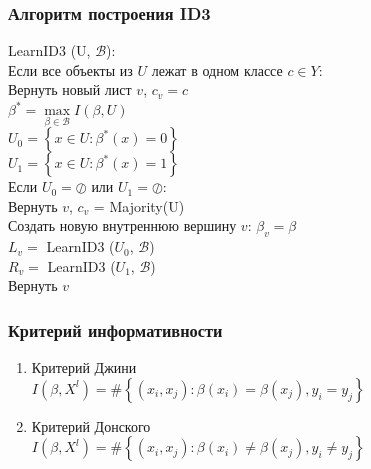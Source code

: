 \documentclass[12pt]{beamer}
\begin{document}
\begin{frame}\frametitle{Алгоритм построения ID3}
LearnID3 (U, $\mathcal{B}$):\\
\hspace{10mm} Если все объекты из $U$ лежат в одном классе $c \in Y$: \\
\hspace{20mm} Вернуть новый лист $v$, $c_v = c$\\
\vspace{3mm}
\hspace{10mm} $\beta^* = \max\limits_{\beta \in \mathcal{B}} I(\beta, U)$\\
\vspace{3mm}
\hspace{10mm} $U_0 = \left\{ x \in U : \beta^*(x) = 0\right\}$	\\
\hspace{10mm} $U_1 = \left\{ x \in U : \beta^*(x) = 1\right\}$	\\
\vspace{3mm}
\hspace{10mm} Если $U_0 = \oslash$ или $U_1 = \oslash$:\\ 
\hspace{20mm} Вернуть $v$, $c_v$ = Majority(U)\\
\vspace{3mm}
\hspace{10mm} Создать новую внутреннюю вершину $v$: $\beta_v = \beta$\\
\vspace{3mm}
\hspace{10mm} $L_v =$ LearnID3 ($U_0$, $\mathcal{B}$)\\
\hspace{10mm} $R_v =$ LearnID3 ($U_1$, $\mathcal{B}$)\\
\hspace{10mm} Вернуть $v$
\end{frame}

\begin{frame}\frametitle{Критерий информативности}
\begin{enumerate}[--]
\item Критерий Джини\\
$I(\beta,X^l)= \# \left\{ (x_i, x_j): \beta(x_i) = \beta(x_j), y_i = y_j \right\}$
\item Критерий Донского\\
$I(\beta,X^l)= \# \left\{ (x_i, x_j): \beta(x_i) \neq \beta(x_j), y_i \neq y_j \right\}$
\end{enumerate}
\end{frame}
\end{document}
